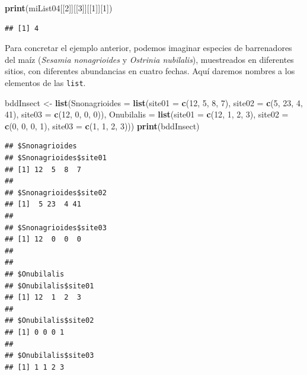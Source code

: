 \documentclass[]{book}
\newenvironment{Shaded}{\begin{snugshade}}{\end{snugshade}}
\newcommand{\KeywordTok}[1]{\textcolor[rgb]{0.13,0.29,0.53}{\textbf{#1}}}
\newcommand{\DataTypeTok}[1]{\textcolor[rgb]{0.13,0.29,0.53}{#1}}
\newcommand{\DecValTok}[1]{\textcolor[rgb]{0.00,0.00,0.81}{#1}}
\newcommand{\StringTok}[1]{\textcolor[rgb]{0.31,0.60,0.02}{#1}}
\newcommand{\NormalTok}[1]{#1}
\begin{document}
\begin{Shaded}
\begin{Highlighting}[]
\KeywordTok{print}\NormalTok{(miList04[[}\DecValTok{2}\NormalTok{]][[}\DecValTok{3}\NormalTok{]][[}\DecValTok{1}\NormalTok{]][}\DecValTok{1}\NormalTok{])}
\end{Highlighting}
\end{Shaded}

\begin{verbatim}
## [1] 4
\end{verbatim}

Para concretar el ejemplo anterior, podemos imaginar especies de
barrenadores del maíz (\emph{Sesamia nonagrioides} y \emph{Ostrinia
nubilalis}), muestreados en diferentes sitios, con diferentes
abundancias en cuatro fechas. Aquí daremos nombres a los elementos de
las \texttt{list}.

\begin{Shaded}
\begin{Highlighting}[]
\NormalTok{bddInsect <-}\StringTok{ }\KeywordTok{list}\NormalTok{(}\DataTypeTok{Snonagrioides =} \KeywordTok{list}\NormalTok{(}\DataTypeTok{site01 =} \KeywordTok{c}\NormalTok{(}\DecValTok{12}\NormalTok{, }\DecValTok{5}\NormalTok{, }\DecValTok{8}\NormalTok{, }\DecValTok{7}\NormalTok{), }\DataTypeTok{site02 =} \KeywordTok{c}\NormalTok{(}\DecValTok{5}\NormalTok{, }\DecValTok{23}\NormalTok{, }\DecValTok{4}\NormalTok{, }\DecValTok{41}\NormalTok{), }\DataTypeTok{site03 =} \KeywordTok{c}\NormalTok{(}\DecValTok{12}\NormalTok{, }\DecValTok{0}\NormalTok{, }\DecValTok{0}\NormalTok{, }\DecValTok{0}\NormalTok{)), }\DataTypeTok{Onubilalis =} \KeywordTok{list}\NormalTok{(}\DataTypeTok{site01 =} \KeywordTok{c}\NormalTok{(}\DecValTok{12}\NormalTok{, }\DecValTok{1}\NormalTok{, }\DecValTok{2}\NormalTok{, }\DecValTok{3}\NormalTok{), }\DataTypeTok{site02 =} \KeywordTok{c}\NormalTok{(}\DecValTok{0}\NormalTok{, }\DecValTok{0}\NormalTok{, }\DecValTok{0}\NormalTok{, }\DecValTok{1}\NormalTok{), }\DataTypeTok{site03 =} \KeywordTok{c}\NormalTok{(}\DecValTok{1}\NormalTok{, }\DecValTok{1}\NormalTok{, }\DecValTok{2}\NormalTok{, }\DecValTok{3}\NormalTok{)))}
\KeywordTok{print}\NormalTok{(bddInsect)}
\end{Highlighting}
\end{Shaded}

\begin{verbatim}
## $Snonagrioides
## $Snonagrioides$site01
## [1] 12  5  8  7
## 
## $Snonagrioides$site02
## [1]  5 23  4 41
## 
## $Snonagrioides$site03
## [1] 12  0  0  0
## 
## 
## $Onubilalis
## $Onubilalis$site01
## [1] 12  1  2  3
## 
## $Onubilalis$site02
## [1] 0 0 0 1
## 
## $Onubilalis$site03
## [1] 1 1 2 3
\end{verbatim}
\end{document}
